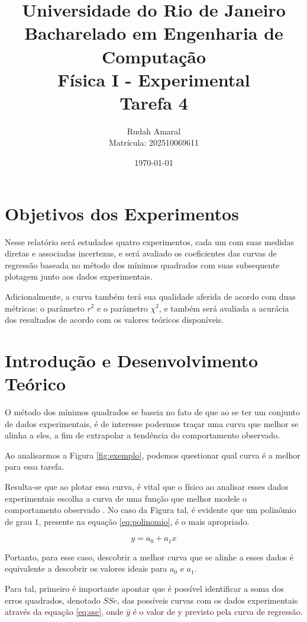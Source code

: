 \documentclass{article}
\title{
    Universidade do Rio de Janeiro\\
    Bacharelado em Engenharia de Computação\\
    Física I - Experimental\\
    Tarefa 4
}
\author{
    Rudah Amaral\\
    Matrícula: 202510069611
}
\date{\today}
\begin{document}
\maketitle
\clearpage

\tableofcontents
\clearpage

\section*{Objetivos dos Experimentos}

Nesse relatório será estudados quatro experimentos, cada um com suas medidas
diretas e associadas incertezas, e será avaliado os coeficientes das curvas de
regressão baseada no método dos mínimos quadrados com suas subsequente plotagem
junto aos dados experimentais.

Adicionalmente, a curva também terá sua qualidade aferida de acordo com duas
métricas: o parâmetro $r^2$ e o parâmetro $\chi^2$, e também será avaliada a
acurácia dos resultados de acordo com os valores teóricos disponíveis.

\section{Introdução e Desenvolvimento Teórico}

O método dos mínimos quadrados se baseia no fato de que ao se ter um conjunto de
dados experimentais, é de interesse podermos traçar uma curva que melhor se
alinha a eles, a fim de extrapolar a tendência do comportamento observado.

Ao analisarmos a Figura \ref{fig:exemplo}, podemos questionar qual curva é a
melhor para essa tarefa.

\clearpage


Resulta-se que ao plotar essa curva, é vital que o físico ao analisar esses
dados experimentais escolha a curva de uma função que melhor modele o
comportamento observado \cite{bjorck1990least}. No caso da Figura tal, é
evidente que um polinômio de grau $1$, presente na equação \eqref{eq:polinomio},
é o mais apropriado.

\begin{equation} \label{eq:polinomio}
    y = a_0 + a_1 x
\end{equation}

Portanto, para esse caso, descobrir a melhor curva que se alinhe a esses dados é
equivalente a descobrir os valores ideais para $a_0$ e $a_1$.

Para tal, primeiro é importante apontar que é possível identificar a soma dos
erros quadrados, denotado $SSe$, das possíveis curvas com os dados experimentais
através da equação \eqref{eq:sse}, onde $\hat y$ é o valor de y previsto pela
curva de regressão.
\end{document}
